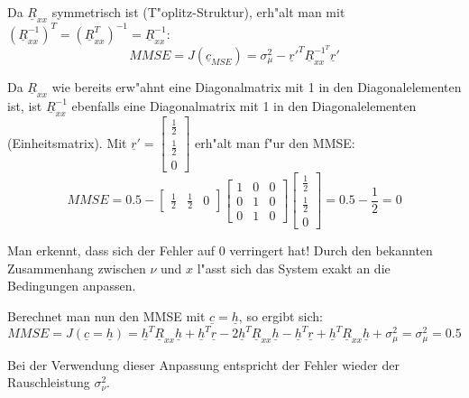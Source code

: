 Da $\underline{R}_{xx}$ symmetrisch ist (T"oplitz-Struktur), erh"alt man mit $(\underline{R}_{xx}^{-1})^T = (\underline{R}_{xx}^T)^{-1} = \underline{R}_{xx}^{-1}$:
\begin{equation}
 MMSE = J(\underline{c}_{MSE}) = \sigma_\mu^2 - \underline{r}'^T \underline{R}_{xx}^{-1^T} \underline{r}'
\end{equation}

Da $\underline{R}_{xx}$ wie bereits erw"ahnt eine Diagonalmatrix mit 1 in den Diagonalelementen ist, ist $\underline{R}_{xx}^{-1}$ ebenfalls eine Diagonalmatrix mit 1 in den Diagonalelementen (Einheitsmatrix). Mit $\underline{r}' = \begin{bmatrix} \frac{1}{2} \\ \frac{1}{2} \\ 0 \end{bmatrix}$ erh"alt man f"ur den MMSE:
\begin{equation}
 MMSE = 0.5 - \begin{bmatrix} \frac{1}{2} &  \frac{1}{2} & 0 \end{bmatrix} \begin{bmatrix} 1 & 0 & 0 \\ 0 & 1 & 0 \\ 0 & 1 & 0 \end{bmatrix} \begin{bmatrix} \frac{1}{2} \\  \frac{1}{2} \\ 0 \end{bmatrix} = 0.5 - \frac{1}{2} = 0
\end{equation}

Man erkennt, dass sich der Fehler auf 0 verringert hat! Durch den bekannten Zusammenhang zwischen $\nu$ und $x$ l"asst sich das System exakt an die Bedingungen anpassen.

Berechnet man nun den MMSE mit $\underline{c} = \underline{h}$, so ergibt sich:
\begin{equation}
 MMSE = J(\underline{c} = \underline{h}) = \underline{h}^T \underline{R}_{xx} \underline{h} + \underline{h}^T \underline{r} - 2 \underline{h}^T \underline{R}_{xx} \underline{h} - \underline{h}^T \underline{r} + \underline{h}^T \underline{R}_{xx} \underline{h} + \sigma_\mu^2 = \sigma_\mu^2 = 0.5
\end{equation}

Bei der Verwendung dieser Anpassung entspricht der Fehler wieder der Rauschleistung $\sigma_\nu^2$.
